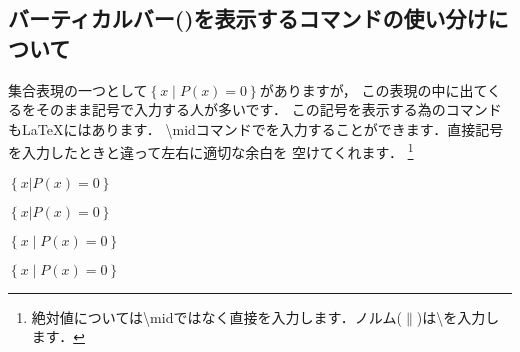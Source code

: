 \documentclass[dvipdfmx,uplatex]{jsarticle}
\begin{document}
{\subsection{バーティカルバー(\textbar )を表示するコマンドの使い分けについて}
集合表現の一つとして$\left\{x \mid P(x) = 0\right\}$がありますが，
この表現の中に出てくる\textbar をそのまま記号で入力する人が多いです．
この記号を表示する為のコマンドも\LaTeX にはあります．
\textbackslash midコマンドで\textbar を入力することができます．直接記号を入力したときと違って左右に適切な余白を
空けてくれます．
\footnote{絶対値については\textbackslash midではなく直接\textbar を入力します．ノルム($\|$)は\textbackslash\textbar を入力します．}
\begin{tcolorbox}[title=バーティカルバーの出力方法]
  \begin{tcolorbox}[title=\textbar を直接入力する, colframe=wrongcolor]
    \begin{excode}
      $\left\{x | P(x) = 0\right\}$
    \end{excode}
    $\left\{x | P(x) = 0\right\}$
  \end{tcolorbox}
  \begin{tcolorbox}[title=\textbackslash mid コマンドを入力する, colframe=correctcolor]
    \begin{excode}
      $\left\{x \mid P(x) = 0\right\}$
    \end{excode}
    $\left\{x \mid P(x) = 0\right\}$
  \end{tcolorbox}
\end{tcolorbox}

}
\end{document}
